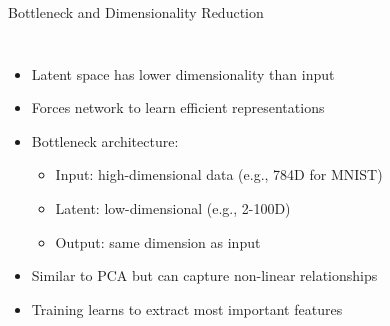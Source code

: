 \documentclass[5pt,aspectratio=169]{beamer}
\begin{document}
\begin{frame}{Bottleneck and Dimensionality Reduction}
  \begin{columns}
    \begin{itemize}
      \item Latent space has lower dimensionality than input
      \item Forces network to learn efficient representations
      \item Bottleneck architecture:
        \begin{itemize}
          \item Input: high-dimensional data (e.g., 784D for MNIST)
          \item Latent: low-dimensional (e.g., 2-100D)
          \item Output: same dimension as input
        \end{itemize}
      \item Similar to PCA but can capture non-linear relationships
      \item Training learns to extract most important features
    \end{itemize}
    
\end{columns}
\end{frame}
\end{document}
